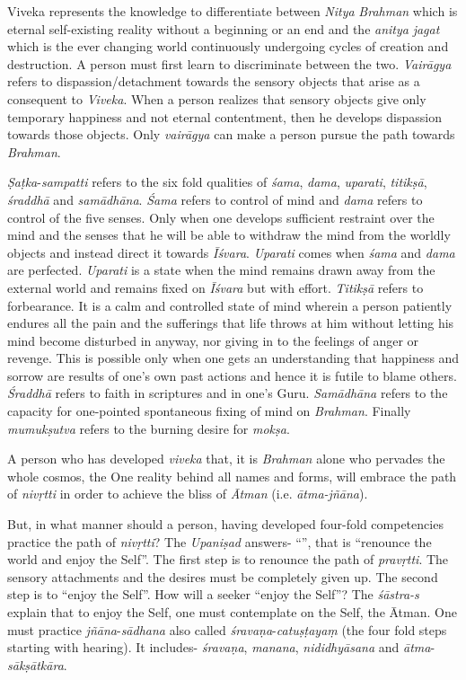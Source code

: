 Viveka represents the knowledge to differentiate between \emph{Nitya} \emph{Brahman} which is eternal self-existing reality without a beginning or an end and the \emph{anitya} \emph{jagat} which is the ever changing world continuously undergoing cycles of creation and destruction. A person must first learn to discriminate between the two. \emph{Vairāgya} refers to dispassion/detachment towards the sensory objects that arise as a consequent to \emph{Viveka}. When a person realizes that sensory objects give only temporary happiness and not eternal contentment, then he develops dispassion towards those objects. Only \emph{vairāgya} can make a person pursue the path towards \emph{Brahman}.
\vskip 1.1pt

\emph{Ṣaṭka}-\emph{sampatti} refers to the six fold qualities of \emph{śama}, \emph{dama}, \emph{uparati}, \emph{titikṣā}, \emph{śraddhā} and \emph{samādhāna}. \emph{Śama} refers to control of mind and \emph{dama} refers to control of the five senses. Only when one develops sufficient restraint over the mind and the senses that he will be able to withdraw the mind from the worldly objects and instead direct it towards \emph{Īśvara}. \emph{Uparati} comes when \emph{śama} and \emph{dama} are perfected. \emph{Uparati} is a state when the mind remains drawn away from the external world and remains fixed on \emph{Īśvara} but with effort. \emph{Titikṣā} refers to forbearance. It is a calm and controlled state of mind wherein a person patiently endures all the pain and the sufferings that life throws at him without letting his mind become disturbed in anyway, nor giving in to the feelings of anger or revenge. This is possible only when one gets an understanding that happiness and sorrow are results of one's own past actions and hence it is futile to blame others. \emph{Śraddhā} refers to faith in scriptures and in one's Guru. \emph{Samādhāna} refers to the capacity for one-pointed spontaneous fixing of mind on \emph{Brahman}. Finally \emph{mumukṣutva} refers to the burning desire for \emph{mokṣa}.
\vskip 1.1pt

A person who has developed \emph{viveka} that, it is \emph{Brahman} alone who pervades the whole cosmos, the One reality behind all names and forms, will embrace the path of \emph{nivṛtti} in order to achieve the bliss of \emph{Ātman} (i.e. \emph{ātma-jñāna}).
\vskip 1.1pt

But, in what manner should a person, having developed four-fold competencies practice the path of \emph{nivṛtti}? The \emph{Upaniṣad} answers- ``'', that is ``renounce the world and enjoy the Self''. The first step is to renounce the path of \emph{pravṛtti}. The sensory attachments and the desires must be completely given up. The second step is to ``enjoy the Self''. How will a seeker ``enjoy the Self''? The \emph{śāstra-s} explain that to enjoy the Self, one must contemplate on the Self, the Ātman. One must practice \emph{jñāna}-\emph{sādhana} also called \emph{śravaṇa}-\emph{catuṣṭayaṃ} (the four fold steps starting with hearing). It includes- \emph{śravaṇa}, \emph{manana}, \emph{nididhyāsana} and \emph{ātma}-\emph{sākṣātkāra}.
\vskip 1.1pt

